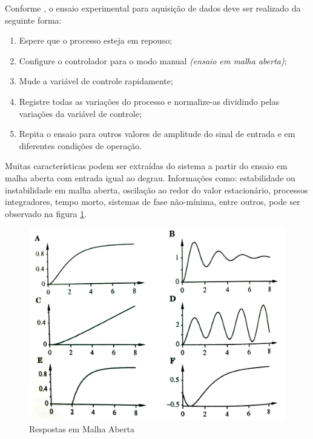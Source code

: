 \documentclass[12pt,oneside,a4paper, chapter=TITLE, section = TITLE, english, brazil]{abntex2}
\begin{document}
Conforme , o ensaio experimental para aquisição de dados deve ser realizado da seguinte forma:

\begin{enumerate}

\item Espere que o processo esteja em repouso;

\item Configure o controlador para o modo manual \textit{(ensaio em malha aberta)};

\item Mude a variável de controle rapidamente;

\item Registre todas as variações do processo e normalize-as dividindo pelas variações da variável de controle;

\item Repita o ensaio para outros valores de amplitude do sinal de entrada e em diferentes condições de operação.

\end{enumerate}


Muitas características podem ser extraídas do sistema a partir do ensaio em malha aberta com entrada igual ao degrau. Informações como: estabilidade ou instabilidade em malha aberta, oscilação ao redor do valor estacionário, processos integradores, tempo morto, sistemas de fase não-mínima, entre outros, pode ser observado na figura \ref{fig:open_loop_resp}.

\begin{figure}[h] %
\centering
\includegraphics[scale=0.25]{./imagens/open_loop_resp}
\caption[Respostas em Malha Aberta]{Respostas em Malha Aberta \cite{astrom}}
\label{fig:open_loop_resp}
\end{figure}
\end{document}
